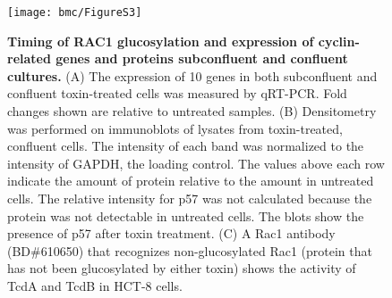 \begin{figure}[h!]
  \centering
  \texttt{[image: bmc/FigureS3]}
  \caption[Timing of RAC1 glucosylation and expression of cyclin-related genes and proteins 
             subconfluent and confluent cultures.]{
  \textbf{Timing of RAC1 glucosylation and expression of cyclin-related genes and proteins 
             subconfluent and confluent cultures.}
(A) The expression of 10 genes in both subconfluent and confluent toxin-treated cells was measured 
by qRT-PCR. Fold changes shown are relative to untreated samples.
(B) Densitometry was performed on immunoblots of lysates from toxin-treated, confluent cells. The 
intensity of each band was normalized to the intensity of GAPDH, the loading control. The values 
above each row indicate the amount of protein relative to the amount in untreated cells. The relative 
intensity for p57 was not calculated because the protein was not detectable in untreated cells. The 
blots show the presence of p57 after toxin treatment.
(C) A Rac1 antibody (BD\#610650) that recognizes non-glucosylated Rac1 (protein that has not been 
glucosylated by either toxin) shows the activity of TcdA and TcdB in HCT-8 cells. }
  \label{bmc:figs3}
\end{figure}



\singlespacing
\printbibliography






